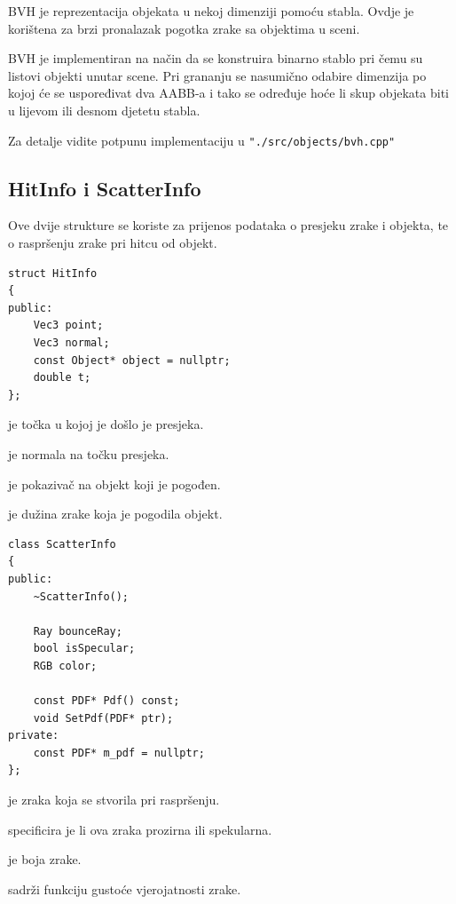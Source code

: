 \documentclass[
12pt, %
oneside, %
english, %
singlespacing, %
parskip, %
headsepline, %
chapterinoneline, %
consistentlayout, %
]{MastersDoctoralThesis} %
\begin{document}
BVH je reprezentacija objekata u nekoj dimenziji pomoću stabla. Ovdje je korištena za brzi
pronalazak pogotka zrake sa objektima u sceni.

BVH je implementiran na način da se konstruira binarno stablo pri čemu su listovi objekti unutar
scene. Pri grananju se nasumično odabire dimenzija po kojoj će se uspoređivat dva AABB-a i tako
se određuje hoće li skup objekata biti u lijevom ili desnom djetetu stabla.

Za detalje vidite potpunu implementaciju u \texttt{"./src/objects/bvh.cpp"}


\subsection*{HitInfo i ScatterInfo}
Ove dvije strukture se koriste za prijenos podataka o presjeku zrake i objekta, te o raspršenju
zrake pri hitcu od objekt.

\begin{verbatim}
struct HitInfo
{
public:
	Vec3 point;
	Vec3 normal;
	const Object* object = nullptr;
	double t;
};
\end{verbatim}
\begin{description}[labelindent=1cm]
	\item[point] je točka u kojoj je došlo je presjeka.
	\item[normal] je normala na točku presjeka.
	\item[object] je pokazivač na objekt koji je pogođen.
	\item[t] je dužina zrake koja je pogodila objekt.
\end{description}

\vspace*{1cm}

\begin{verbatim}
class ScatterInfo
{
public:
	~ScatterInfo();

	Ray bounceRay;
	bool isSpecular;
	RGB color;

	const PDF* Pdf() const;
	void SetPdf(PDF* ptr);
private:
	const PDF* m_pdf = nullptr;
};
\end{verbatim}
\begin{description}[labelindent=1cm]
	\item[bounceRay] je zraka koja se stvorila pri raspršenju.
	\item[isSpecular] specificira je li ova zraka prozirna ili spekularna.
	\item[color] je boja zrake.
	\item[m\_pdf] sadrži funkciju gustoće vjerojatnosti zrake. 
\end{description}
\end{document}
